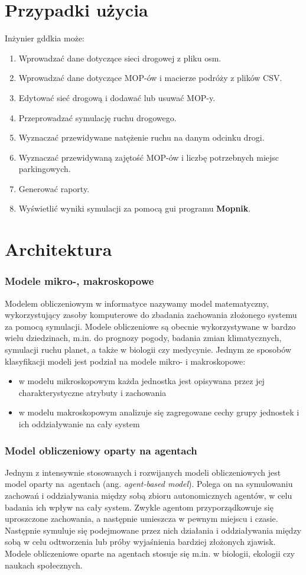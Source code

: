 \section{Przypadki użycia}
Inżynier \acrshort{gddkia} może:
\begin{enumerate}
  \item Wprowadzać dane dotyczące sieci drogowej z pliku osm.
  \item Wprowadzać dane dotyczące MOP-ów i macierze podróży z plików CSV.
  \item Edytować sieć drogową i dodawać lub usuwać MOP-y.
  \item Przeprowadzać symulację ruchu drogowego.
  \item Wyznaczać przewidywane natężenie ruchu na danym odcinku drogi.
  \item Wyznaczać przewidywaną zajętość MOP-ów i liczbę potrzebnych miejsc parkingowych.
  \item Generować raporty.
  \item Wyświetlić wyniki symulacji za pomocą \acrshort{gui} programu \textbf{Mopnik}.
\end{enumerate}

\section{Architektura}

\subsubsection{Modele mikro-, makroskopowe}
Modelem obliczeniowym w informatyce nazywamy model matematyczny, wykorzystujący zasoby komputerowe do zbadania zachowania złożonego systemu za pomocą symulacji\cite{model}. Modele obliczeniowe są obecnie wykorzystywane w bardzo wielu dziedzinach, m.in. do prognozy pogody, badania zmian klimatycznych, symulacji ruchu planet, a także w biologii czy medycynie. Jednym ze sposobów klasyfikacji modeli jest podział na modele mikro- i makroskopowe\cite{micmac}:
\begin{itemize}
\item w modelu mikroskopowym każda jednostka jest opisywana przez jej charakterystyczne atrybuty i zachowania
\item w modelu makroskopowym analizuje się zagregowane cechy grupy jednostek i ich oddziaływanie na cały system
\end{itemize}
\subsubsection{Model obliczeniowy oparty na agentach}
Jednym z intensywnie stosowanych i rozwijanych modeli obliczeniowych jest model oparty na~agentach (ang. \textit{agent-based model}).
Polega on na symulowaniu zachowań i oddziaływania między sobą zbioru autonomicznych agentów, w celu badania ich wpływ na cały system\cite{agent-based}. Zwykle agentom przyporządkowuje się uproszczone zachowania, a następnie umieszcza w pewnym miejscu i czasie. Następnie symuluje się podejmowane przez nich działania i oddziaływania między sobą w celu odtworzenia lub próby wyjaśnienia bardziej złożonych zjawisk. Modele obliczeniowe oparte na agentach stosuje się m.in. w biologii, ekologii czy naukach społecznych.
